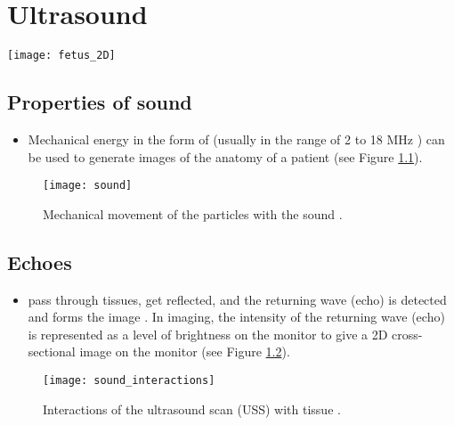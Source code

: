 \chapter{Ultrasound}
\vspace{-40ex}\hspace{35ex}
\texttt{[image: fetus\_2D]}

\section{Properties of sound}

\begin{itemize}
\item Mechanical energy in the form of  (usually in the range of 2 to 18 MHz
  \cite{abdulla2025sound})  can be
  used to generate images of the anatomy of a patient (see Figure
  \ref{fig:sound}).
\end{itemize}
\begin{figure}[!h]
  \centering
  \texttt{[image: sound]}
  \caption{Mechanical movement of the particles with the sound
    \cite{abdulla2025properties_sound}.\label{fig:sound}}
\end{figure}

\section{Echoes}
\begin{itemize}
\item {} pass
  through tissues, get reflected, and the returning wave (echo) is
  detected and forms the
  image \cite{bushberg2011essential,abdulla2025ultrasound_machine}. In
  imaging, the intensity of the returning wave (echo) is represented
  as a level of brightness on the monitor to give a 2D cross-sectional
  image on the monitor \cite{abdulla2025ultrasound} (see Figure
  \ref{fig:interactions}).
\end{itemize}
\begin{figure}[!h]
  \centering
  \texttt{[image: sound\_interactions]}
  \caption{Interactions of the ultrasound scan (USS) with tissue
    \cite{abdulla2025properties_sound}.\label{fig:interactions}}
\end{figure}

